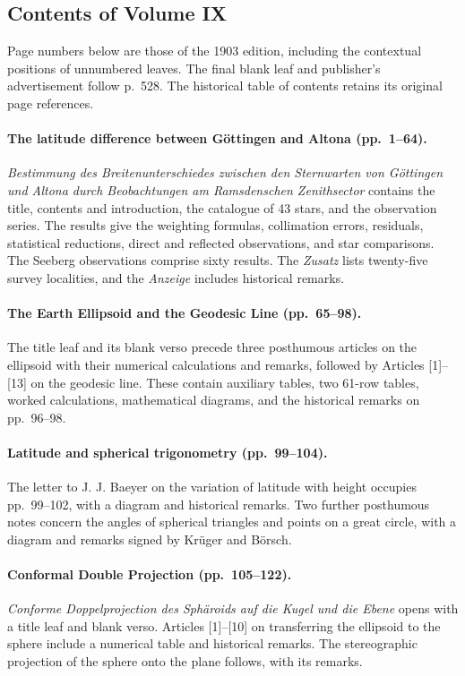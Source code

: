 \subsection*{Contents of Volume IX}

\noindent Page numbers below are those of the 1903 edition, including the contextual positions of unnumbered leaves. The final blank leaf and publisher's advertisement follow p.~528. The historical table of contents retains its original page references.

\paragraph{The latitude difference between Göttingen and Altona (pp.~1--64).}
\textit{Bestimmung des Breitenunterschiedes zwischen den Sternwarten von Göttingen und Altona durch Beobachtungen am Ramsdenschen Zenithsector} contains the title, contents and introduction, the catalogue of 43 stars, and the observation series. The results give the weighting formulas, collimation errors, residuals, statistical reductions, direct and reflected observations, and star comparisons. The Seeberg observations comprise sixty results. The \textit{Zusatz} lists twenty-five survey localities, and the \textit{Anzeige} includes historical remarks.

\paragraph{The Earth Ellipsoid and the Geodesic Line (pp.~65--98).}
The title leaf and its blank verso precede three posthumous articles on the ellipsoid with their numerical calculations and remarks, followed by Articles [1]--[13] on the geodesic line. These contain auxiliary tables, two 61-row tables, worked calculations, mathematical diagrams, and the historical remarks on pp.~96--98.

\paragraph{Latitude and spherical trigonometry (pp.~99--104).}
The letter to J. J. Baeyer on the variation of latitude with height occupies pp.~99--102, with a diagram and historical remarks. Two further posthumous notes concern the angles of spherical triangles and points on a great circle, with a diagram and remarks signed by Krüger and Börsch.

\paragraph{Conformal Double Projection (pp.~105--122).}
\textit{Conforme Doppelprojection des Sphäroids auf die Kugel und die Ebene} opens with a title leaf and blank verso. Articles [1]--[10] on transferring the ellipsoid to the sphere include a numerical table and historical remarks. The stereographic projection of the sphere onto the plane follows, with its remarks.


